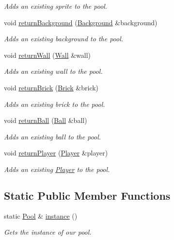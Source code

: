 \begin{DoxyCompactItemize}
\begin{DoxyCompactList}\small\item\em Adds an existing sprite to the pool. \end{DoxyCompactList}\item 
void \hyperlink{class_pool_af6234b218a3dd72a440a3381b35c9e36}{return\+Background} (\hyperlink{class_background}{Background} \&background)
\begin{DoxyCompactList}\small\item\em Adds an existing background to the pool. \end{DoxyCompactList}\item 
void \hyperlink{class_pool_a883e139a1b626e514a7e70dd3385e17e}{return\+Wall} (\hyperlink{class_wall}{Wall} \&wall)
\begin{DoxyCompactList}\small\item\em Adds an existing wall to the pool. \end{DoxyCompactList}\item 
void \hyperlink{class_pool_a0d8fb68bad74c14b0130a96032cc5067}{return\+Brick} (\hyperlink{class_brick}{Brick} \&brick)
\begin{DoxyCompactList}\small\item\em Adds an existing brick to the pool. \end{DoxyCompactList}\item 
void \hyperlink{class_pool_a0da5595d7b9e70aed2dd807ee4a6ae26}{return\+Ball} (\hyperlink{class_ball}{Ball} \&ball)
\begin{DoxyCompactList}\small\item\em Adds an existing ball to the pool. \end{DoxyCompactList}\item 
void \hyperlink{class_pool_a3e6ed735e15ad548db48a0cefbb5b821}{return\+Player} (\hyperlink{class_player}{Player} \&player)
\begin{DoxyCompactList}\small\item\em Adds an existing \hyperlink{class_player}{Player} to the pool. \end{DoxyCompactList}\end{DoxyCompactItemize}
\subsection*{Static Public Member Functions}
\begin{DoxyCompactItemize}
\item 
static \hyperlink{class_pool}{Pool} \& \hyperlink{class_pool_a20e44e0054d4eedf57f1943b87c06e20}{instance} ()
\begin{DoxyCompactList}\small\item\em Gets the instance of our pool. \end{DoxyCompactList}\end{DoxyCompactItemize}
